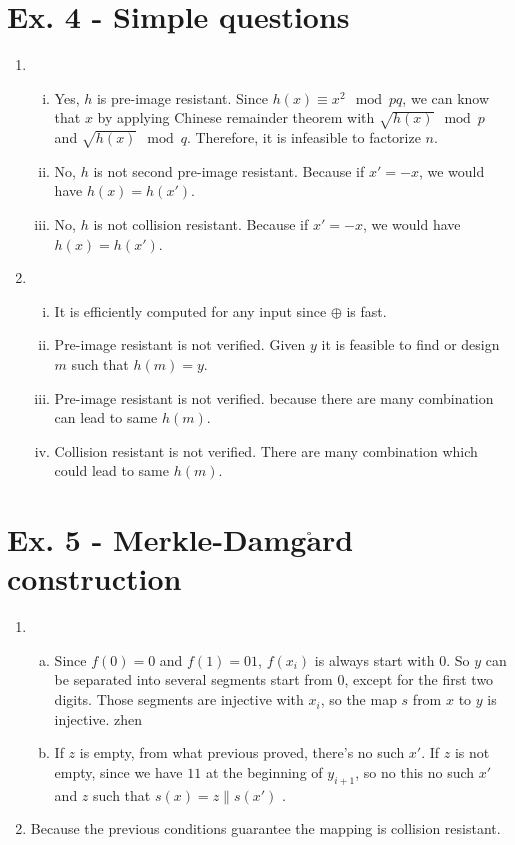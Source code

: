 \documentclass[a4paper,12pt]{journal}
\begin{document}
\section*{Ex. 4 - Simple questions}
\begin{enumerate}
	\item\begin{enumerate}[(i)]
		\item Yes, $h$ is pre-image resistant. Since $h(x) \equiv x^{2} \mod pq$, we can know that $x$ by applying Chinese remainder theorem with $\sqrt{h(x)} \mod p$ and $\sqrt{h(x)} \mod q$. Therefore, it is infeasible to factorize $n$.
		
		\item No, $h$ is not second pre-image resistant. Because if $x' = -x$, we would have $h(x) = h(x')$.
		
		\item No, $h$ is not collision resistant. Because if $x' = -x$, we would have $h(x) = h(x')$.
	\end{enumerate}
	
	\item\begin{enumerate}[(i)]
		\item It is efficiently computed for any input since $\oplus$ is fast.
		
		\item Pre-image resistant is not verified. Given $y$ it is feasible to find or design $m$ such that $h(m) = y$.
		
		\item Pre-image resistant is not verified. because there are many combination can lead to same $h(m)$.
		
		\item Collision resistant is not verified. There are many combination which could lead to same $h(m)$.
	\end{enumerate}
\end{enumerate}



\section*{Ex. 5 - Merkle-Damg$\mathrm{\mathbf{\mathring{a}}}$rd construction}
\begin{enumerate}
	\item \begin{enumerate}[a)]
		\item Since $f(0)=0$ and $f(1)=01$, $f(x_{i})$ is always start with $0$. So $y$ can be separated into several segments start from $0$, except for the first two digits. Those segments are injective with $x_{i}$, so the map $s$ from $x$ to $y$ is injective.
		zhen
		\item If $z$ is empty, from what previous proved, there's no such $x'$. If $z$ is not empty, since we have $11$ at the beginning of $y_{i+1}$, so no this no such $x'$ and $z$ such that $s(x) = z \| s(x')$ .
	\end{enumerate}
	
	\item Because the previous conditions guarantee the mapping is collision resistant.
\end{enumerate}
 
\end{document}
